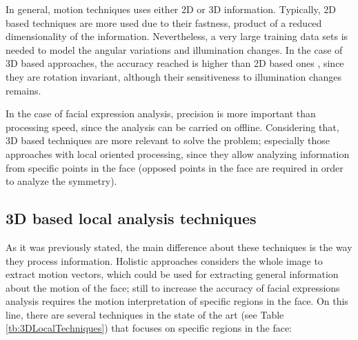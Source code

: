 In general, motion techniques uses either 2D or 3D information. Typically, 2D based techniques are more used due to their fastness, product of a reduced dimensionality of the information. Nevertheless,  a very large training data sets is needed to model the angular variations and illumination changes. In the case of 3D based approaches, the accuracy reached is higher than 2D based ones \cite{Fang2012}, since they are rotation invariant, although their sensitiveness to illumination changes remains.

In the case of facial expression analysis, precision is more important than processing speed, since the analysis can be carried on offline. Considering that, 3D based techniques are more relevant to solve the problem; especially those approaches with local oriented processing, since they allow analyzing information from specific points in the face (opposed points in the face are required in order to analyze the symmetry).

\subsection{3D based local analysis techniques}
As it was previously stated, the main difference about these techniques is the way they process information. Holistic approaches considers the whole image to extract motion vectors, which could be used for extracting general information about the motion of the face; still to increase the accuracy of facial expressions analysis requires the motion interpretation of specific regions in the face. On this line, there are several techniques in the state of the art (see Table \ref{tb:3DLocalTechniques}) that focuses on specific regions in the face:

